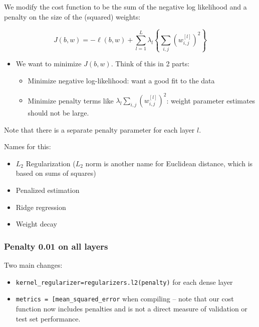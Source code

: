 \documentclass[11pt]{article}
\providecommand{\tightlist}{%
      \setlength{\itemsep}{0pt}\setlength{\parskip}{0pt}}
\begin{document}
We modify the cost function to be the sum of the negative log likelihood
and a penalty on the size of the (squared) weights:

\[J(b, w) = -\ell(b, w) + \sum_{l = 1}^L \lambda_l \left\{ \sum_{i,j} \left(w_{i,j}^{[l]}\right)^2 \right\}\]

\begin{itemize}
\tightlist
\item
  We want to minimize \(J(b, w)\). Think of this in 2 parts:

  \begin{itemize}
  \tightlist
  \item
    Minimize negative log-likelihood: want a good fit to the data
  \item
    Minimize penalty terms like
    \(\lambda_l \sum_{i,j} \left(w_{i,j}^{[l]}\right)^2\): weight
    parameter estimates should not be large.
  \end{itemize}
\end{itemize}

Note that there is a separate penalty parameter for each layer \(l\).

Names for this:

\begin{itemize}
\tightlist
\item
  \(L_2\) Regularization (\(L_2\) norm is another name for Euclidean
  distance, which is based on sums of squares)
\item
  Penalized estimation
\item
  Ridge regression
\item
  Weight decay
\end{itemize}

    \hypertarget{penalty-0.01-on-all-layers}{%
\subsubsection{Penalty 0.01 on all
layers}\label{penalty-0.01-on-all-layers}}

Two main changes:

\begin{itemize}
\tightlist
\item
  \texttt{kernel\_regularizer=regularizers.l2(penalty)} for each dense
  layer
\item
  \texttt{metrics\ =\ {[}\textquotesingle{}mean\_squared\_error\textquotesingle{}{]}}
  when compiling -- note that our cost function now includes penalties
  and is not a direct measure of validation or test set performance.
\end{itemize}
\end{document}

